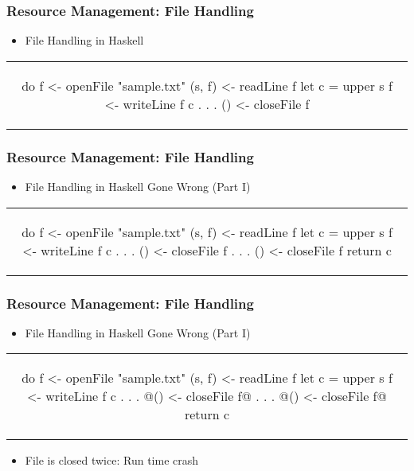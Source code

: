 \begin{frame}[fragile,c]
  \frametitle{Resource Management: File Handling}
  \begin{center}
    \begin{itemize}
    \item File Handling in Haskell
    \end{itemize}
    \begin{tabular}[h]{c}
      \begin{haskell}
        do f  <- openFile "sample.txt"
           (s, f)  <- readLine f
           let c = upper s
           f <- writeLine f c
                  .
                  .
                  .
           () <- closeFile f
      \end{haskell}
    \end{tabular}
  \end{center}
\end{frame}

\begin{frame}[fragile, c]
  \frametitle{Resource Management: File Handling}
  \begin{center}
    \begin{itemize}
    \item File Handling in Haskell Gone Wrong (Part I)
    \end{itemize}
    \begin{tabular}[h]{c}
    \begin{haskell}
      do f  <- openFile "sample.txt"
         (s, f)  <- readLine f
         let c = upper s
         f <- writeLine f c
              .
              .
              .
         () <- closeFile f
              .
              .
              .
         () <- closeFile f
         return c
    \end{haskell}
    \end{tabular}
  \end{center}
\end{frame}

\begin{frame}[fragile, c]
  \frametitle{Resource Management: File Handling}
  \begin{center}
    \begin{itemize}
    \item File Handling in Haskell Gone Wrong (Part I)
    \end{itemize}
    \begin{tabular}[h]{c}
    \begin{haskell}
      do f  <- openFile "sample.txt"
         (s, f)  <- readLine f
         let c = upper s
         f <- writeLine f c
              .
              .
              .
        @() <- closeFile f@
              .
              .
              .
        @() <- closeFile f@
         return c
    \end{haskell}
    \end{tabular}
    \begin{itemize}
    \item File is closed twice: Run time crash
    \end{itemize}
  \end{center}
\end{frame}


